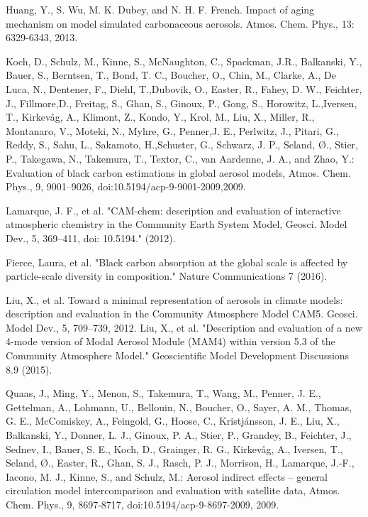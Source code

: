 \documentclass[12pt]{article}
\begin{document}
Huang, Y., S. Wu, M. K. Dubey, and N. H. F. French.  Impact of aging mechanism on model simulated carbonaceous aerosols. Atmos. Chem. Phys., 13: 6329-6343, 2013.

Koch, D., Schulz, M., Kinne, S., McNaughton, C., Spackman, J.R., Balkanski, Y., Bauer, S., Berntsen, T., Bond, T. C., Boucher, O., Chin, M., Clarke, A., De Luca, N., Dentener, F., Diehl, T.,Dubovik, O., Easter, R., Fahey, D. W., Feichter, J., Fillmore,D., Freitag, S., Ghan, S., Ginoux, P., Gong, S., Horowitz, L.,Iversen, T., Kirkevåg, A., Klimont, Z., Kondo, Y., Krol, M., Liu, X., Miller, R., Montanaro, V., Moteki, N., Myhre, G., Penner,J. E., Perlwitz, J., Pitari, G., Reddy, S., Sahu, L., Sakamoto, H.,Schuster, G., Schwarz, J. P., Seland, Ø., Stier, P., Takegawa, N., Takemura, T., Textor, C., van Aardenne, J. A., and Zhao, Y.: Evaluation of black carbon estimations in global aerosol models, Atmos. Chem. Phys., 9, 9001–9026, doi:10.5194/acp-9-9001-2009,2009.

Lamarque, J. F., et al. "CAM-chem: description and evaluation of interactive atmospheric chemistry in the Community Earth System Model, Geosci. Model Dev., 5, 369–411, doi: 10.5194." (2012).

Fierce, Laura, et al. "Black carbon absorption at the global scale is affected by particle-scale diversity in composition." Nature Communications 7 (2016).

Liu, X., et al. Toward a minimal representation of aerosols in climate models: description and evaluation in the Community Atmosphere Model CAM5. Geosci. Model Dev., 5, 709–739, 2012.
Liu, X., et al. "Description and evaluation of a new 4-mode version of Modal Aerosol Module (MAM4) within version 5.3 of the Community Atmosphere Model." Geoscientific Model Development Discussions 8.9 (2015).

Quaas, J., Ming, Y., Menon, S., Takemura, T., Wang, M., Penner, J. E., Gettelman, A., Lohmann, U., Bellouin, N., Boucher, O., Sayer, A. M., Thomas, G. E., McComiskey, A., Feingold, G., Hoose, C., Kristjánsson, J. E., Liu, X., Balkanski, Y., Donner, L. J., Ginoux, P. A., Stier, P., Grandey, B., Feichter, J., Sednev, I., Bauer, S. E., Koch, D., Grainger, R. G., Kirkevåg, A., Iversen, T., Seland, Ø., Easter, R., Ghan, S. J., Rasch, P. J., Morrison, H., Lamarque, J.-F., Iacono, M. J., Kinne, S., and Schulz, M.: Aerosol indirect effects – general circulation model intercomparison and evaluation with satellite data, Atmos. Chem. Phys., 9, 8697-8717, doi:10.5194/acp-9-8697-2009, 2009.
\end{document}
